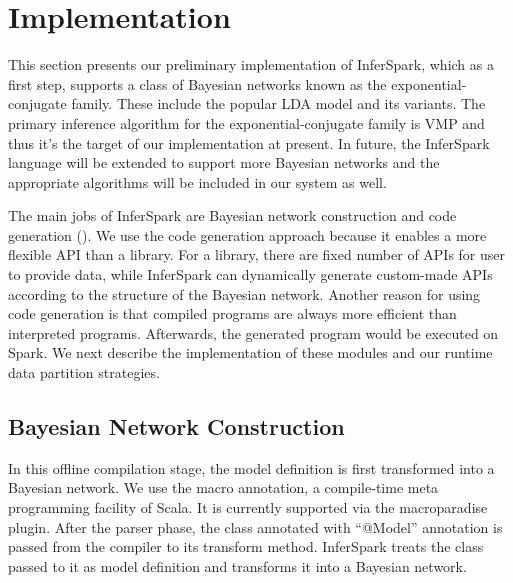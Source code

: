\section{Implementation}
\label{sec:implementation}
This section presents our preliminary implementation of InferSpark, which
as a first step, supports a class of Bayesian networks known as the 
exponential-conjugate family. These include the popular LDA model and its
variants. The primary inference algorithm for the exponential-conjugate family
is VMP and thus it's the target of our implementation at present.
In future, the InferSpark language will be extended to support more Bayesian
networks and the appropriate algorithms will be included in our system
as well.

The main jobs of InferSpark are Bayesian network construction and 
code generation (). 
We use the code generation approach because it enables a more flexible API
than a library. For a library, there are fixed number of APIs for user to
provide data, while InferSpark can dynamically generate custom-made APIs 
according to the structure of the Bayesian network. 
Another reason for using code generation is
that compiled programs are always more efficient than interpreted programs.
Afterwards, the generated program would be executed on Spark.
We next describe the implementation of
these modules and our runtime data partition strategies.




\subsection{Bayesian Network Construction}\label{bnc}

In this offline compilation stage, the model definition is first transformed into a Bayesian network.
We use the macro annotation, a compile-time meta programming facility of
Scala.  It is currently supported via the macroparadise plugin. After the
parser phase, the class annotated with ``{\sf @Model}'' annotation is passed from the
compiler to its transform method. InferSpark treats the class passed to it as
model definition and transforms it into a Bayesian network.

